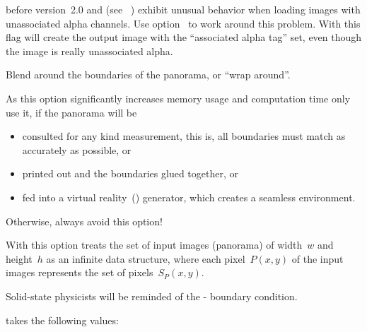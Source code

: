 \begin{codelist}
   before version~2.0 and
   (see \appendixName~)
  exhibit unusual behavior when loading images with unassociated alpha channels.  Use
  option~ to work around this problem.  With this flag \App{} will create the output
  image with the ``associated alpha tag'' set, even though the image is really unassociated
  alpha.


  \label{opt:wrap}%
\item[\itempar{-w \optional{\metavar{MODE}} \\ --wrap\optional{=\metavar{MODE}}}]\itemend
  Blend around the boundaries of the panorama, or ``wrap around''.

  As this option significantly increases memory usage and computation time only use it, if the
  panorama will be

  \begin{itemize}
  \item
    consulted for any kind measurement, this is, all boundaries must match as accurately as
    possible, or

  \item
    printed out and the boundaries glued together, or

  \item
    fed into a virtual reality~() generator, which creates a seamless environment.
  \end{itemize}

  \noindent Otherwise, always avoid this option!

  With this option \App{} treats the set of input images (panorama) of width~$w$ and height~$h$
  as an infinite data structure, where each pixel~$P(x, y)$ of the input images represents the
  set of pixels~$S_P(x, y)$.

  \begin{geeknote}
    Solid-state physicists will be reminded of the
    \ahref{\wikipediabornvonkarman}%
          {-%
            boundary condition}.
  \end{geeknote}

   takes the following values:


\end{codelist}
